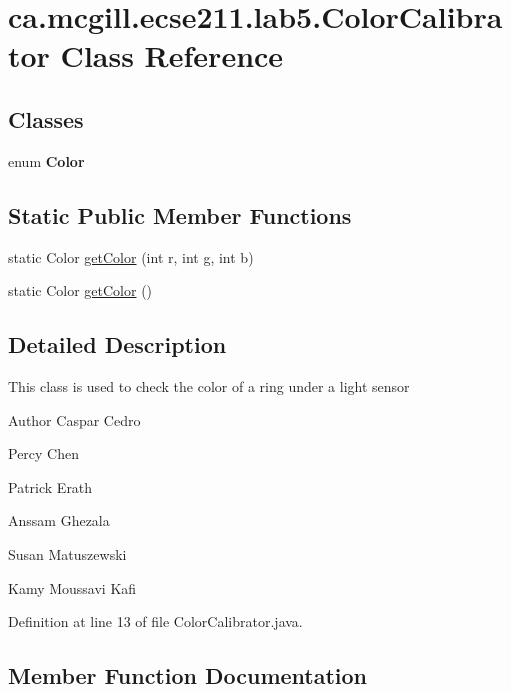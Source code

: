 \hypertarget{classca_1_1mcgill_1_1ecse211_1_1lab5_1_1_color_calibrator}{}\section{ca.\+mcgill.\+ecse211.\+lab5.\+Color\+Calibrator Class Reference}
\label{classca_1_1mcgill_1_1ecse211_1_1lab5_1_1_color_calibrator}
\subsection*{Classes}
\begin{DoxyCompactItemize}
\item 
enum {\bfseries Color}
\end{DoxyCompactItemize}
\subsection*{Static Public Member Functions}
\begin{DoxyCompactItemize}
\item 
static Color \hyperlink{classca_1_1mcgill_1_1ecse211_1_1lab5_1_1_color_calibrator_a115188f4d3b465e09db3482f8a6f25d2}{get\+Color} (int r, int g, int b)
\item 
static Color \hyperlink{classca_1_1mcgill_1_1ecse211_1_1lab5_1_1_color_calibrator_ac6a2e41db5bd91b1356f53106178862e}{get\+Color} ()
\end{DoxyCompactItemize}


\subsection{Detailed Description}
This class is used to check the color of a ring under a light sensor

\begin{DoxyAuthor}{Author}
Caspar Cedro 

Percy Chen 

Patrick Erath 

Anssam Ghezala 

Susan Matuszewski 

Kamy Moussavi Kafi 
\end{DoxyAuthor}


Definition at line 13 of file Color\+Calibrator.\+java.



\subsection{Member Function Documentation}
\mbox{\label{classca_1_1mcgill_1_1ecse211_1_1lab5_1_1_color_calibrator_a115188f4d3b465e09db3482f8a6f25d2}} 
